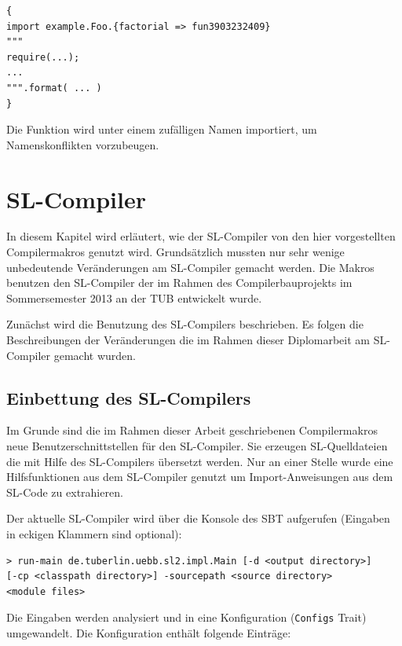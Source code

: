 \documentclass[12pt,bibtotoc]{scrreprt}
\begin{document}
\begin{lstlisting}[caption={Scala \lstinline!import!-Anweisung für eine annotierte Funktion}, label=lst:slci-function-import, float=h]
{
import example.Foo.{factorial => fun3903232409}
"""
require(...);
...
""".format( ... )
}
\end{lstlisting}

Die Funktion wird unter einem zufälligen Namen importiert, um Namenskonflikten vorzubeugen.

\chapter{SL-Compiler}
\label{chap:dom-monad-extensions}

In diesem Kapitel wird erläutert, wie der SL-Compiler von den hier vorgestellten Compilermakros genutzt wird. Grundsätzlich mussten nur sehr wenige unbedeutende Veränderungen am SL-Compiler gemacht werden. Die Makros benutzen den SL-Compiler der im Rahmen des Compilerbauprojekts im Sommersemester 2013 an der \ac{TUB} entwickelt wurde\cite{Bisping2013}.

Zunächst wird die Benutzung des SL-Compilers beschrieben. Es folgen die Beschreibungen der Veränderungen die im Rahmen dieser Diplomarbeit am SL-Compiler gemacht wurden.

\section{Einbettung des SL-Compilers}

Im Grunde sind die im Rahmen dieser Arbeit geschriebenen Compilermakros neue Benutzerschnittstellen für den SL-Compiler. Sie erzeugen SL-Quelldateien die mit Hilfe des SL-Compilers übersetzt werden. Nur an einer Stelle wurde eine Hilfsfunktionen aus dem SL-Compiler genutzt um Import-Anweisungen aus dem SL-Code zu extrahieren.

Der aktuelle SL-Compiler wird über die Konsole des \ac{SBT} aufgerufen (Eingaben in eckigen Klammern sind optional)\cite{TypeSave}\cite[S. 15f]{Bisping2013}:

\begin{lstlisting}
> run-main de.tuberlin.uebb.sl2.impl.Main [-d <output directory>]
[-cp <classpath directory>] -sourcepath <source directory>
<module files>
\end{lstlisting}

Die Eingaben werden analysiert und in eine Konfiguration (\lstinline!Configs! Trait) umgewandelt. Die Konfiguration enthält folgende Einträge:
\end{document}

